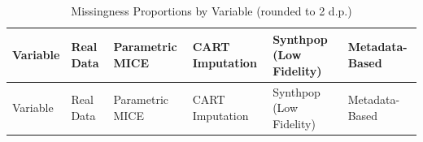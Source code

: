 \documentclass[
  letterpaper,
  DIV=11,
  numbers=noendperiod]{scrartcl}
\begin{document}
\begin{longtable}[]{@{}
  >{\raggedright\arraybackslash}p{}
  >{\raggedleft\arraybackslash}p{}
  >{\raggedleft\arraybackslash}p{}
  >{\raggedleft\arraybackslash}p{}
  >{\raggedleft\arraybackslash}p{}
  >{\raggedleft\arraybackslash}p{}@{}}
\caption{Missingness Proportions by Variable (rounded to 2
d.p.)}\tabularnewline
\toprule\noalign{}
\begin{minipage}[b]{\linewidth}\raggedright
Variable
\end{minipage} & \begin{minipage}[b]{\linewidth}\raggedleft
Real Data
\end{minipage} & \begin{minipage}[b]{\linewidth}\raggedleft
Parametric MICE
\end{minipage} & \begin{minipage}[b]{\linewidth}\raggedleft
CART Imputation
\end{minipage} & \begin{minipage}[b]{\linewidth}\raggedleft
Synthpop (Low Fidelity)
\end{minipage} & \begin{minipage}[b]{\linewidth}\raggedleft
Metadata-Based
\end{minipage} \\
\midrule\noalign{}
\endfirsthead
\toprule\noalign{}
\begin{minipage}[b]{\linewidth}\raggedright
Variable
\end{minipage} & \begin{minipage}[b]{\linewidth}\raggedleft
Real Data
\end{minipage} & \begin{minipage}[b]{\linewidth}\raggedleft
Parametric MICE
\end{minipage} & \begin{minipage}[b]{\linewidth}\raggedleft
CART Imputation
\end{minipage} & \begin{minipage}[b]{\linewidth}\raggedleft
Synthpop (Low Fidelity)
\end{minipage} & \begin{minipage}[b]{\linewidth}\raggedleft
Metadata-Based
\end{minipage} \\

\end{longtable}
\end{document}
